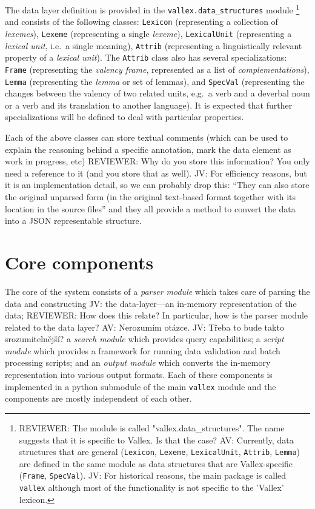 \documentclass[10pt, a4paper]{article}
\newcommand{\py}[1]{{\tt #1}}
\newcommand{\av}[1]{{\color{ansa} AV: #1}}
\newcommand{\jv}[1]{{\color{svlinks} JV: #1}}
\newcommand{\rrr}[1]{{\color{red} REVIEWER: #1}}
\begin{document}
The data layer definition is provided in the \py{vallex.data\_structures} module%
\footnote{%
\rrr{The module is called "vallex.data\_structures". The name suggests that it is specific to Vallex. Is that the case?
} 
\av{Currently, data structures that are general
(\py{Lexicon}, \py{Lexeme}, \py{LexicalUnit}, \py{Attrib}, \py{Lemma})
are defined in the same module as data structures that are Vallex-specific
(\py{Frame}, \py{SpecVal}).
}
\jv{For historical reasons, the main package is called \py{vallex} although most of the functionality
is not specific to the 'Vallex' lexicon.}
}
and consists of the
following classes:
\py{Lexicon} (representing a collection of \emph{lexemes}), \py{Lexeme} (representing
a single \emph{lexeme}), \py{LexicalUnit} (representing a \emph{lexical unit}, i.e.\ a single meaning), \py{Attrib} (representing a linguistically relevant property of a \emph{lexical unit}). The \py{Attrib} class also has several specializations:
\py{Frame} (representing the \emph{valency frame}, represented as a list of \emph{complementations}),
\py{Lemma} (representing the \emph{lemma} or set of lemmas), and
\py{SpecVal} (representing the changes between the valency of two related units,
e.g.\ a verb and a deverbal noun or a verb and its translation to another language).
It is expected that further specializations
will be defined to deal with particular properties.

Each of the above classes can store textual comments (which can be used to explain
the reasoning behind a specific annotation, mark the data element as work in progress, etc)
\rrr{Why do you store this information? You only need a reference to it (and you store that as well).}
\jv{For efficiency reasons, but it is an implementation detail, so we can probably drop this: ``They can also
store the original unparsed form (in the original text-based format
together with its location in the source files''}
and they all provide a method to convert the data into a JSON representable structure.

\section{Core components}
The core of the system consists of a \emph{parser module} which takes care of parsing the data and
constructing \jv{the data-layer---an in-memory representation of the data};
\rrr{How does this relate? In particular, how is the parser module related to the data layer?}
\av{Nerozumím otázce.}
\jv{Třeba to bude takto srozumitelnější?}
a \emph{search module} which
provides query capabilities; a \emph{script module} which provides a framework for running data validation
and batch processing scripts; and an \emph{output module} which converts the in-memory representation into
various output formats. Each of these components is implemented in a python submodule of the main \py{vallex}
module and the components are mostly independent of each other.
\end{document}
